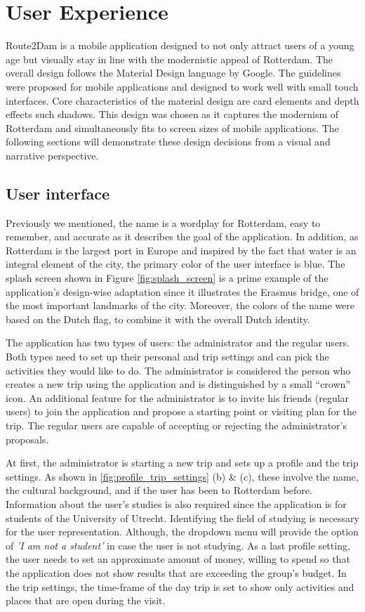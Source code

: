 \documentclass[11pt,a4paper,oneside]{article}
\begin{document}
\section{User Experience}
\label{sec:UX}
Route2Dam is a mobile application designed to not only attract users of a young age but visually stay in line with the modernistic appeal of Rotterdam. The overall design follows the Material Design language by Google.\cite{googleinc._MaterialDesign_2014} The guidelines were proposed for mobile applications and designed to work well with small touch interfaces. Core characteristics of the material design are card elements and depth effects such shadows. This design was chosen as it captures the modernism of Rotterdam and simultaneously fits to screen sizes of mobile applications. The following sections will demonstrate these design decisions from a visual and narrative perspective.

\subsection{User interface}
Previously we mentioned, the name is a wordplay for Rotterdam, easy to remember, and accurate as it describes the goal of the application. In addition, as Rotterdam is the largest port in Europe and inspired by the fact that water is an integral element of the city, the primary color of the user interface is blue. The splash screen shown in Figure \autoref{fig:splash_screen} is a prime example of the application's design-wise adaptation since it illustrates the Erasmus bridge, one of the most important landmarks of the city. Moreover, the colors of the name were based on the Dutch flag, to combine it with the overall Dutch identity.      


The application has two types of users: the administrator and the regular users. Both types need to set up their personal and trip settings and can pick the activities they would like to do. The administrator is considered the person who creates a new trip using the application and is distinguished by a small “crown” icon. An additional feature for the administrator is to invite his friends (regular users) to join the application and propose a starting point or visiting plan for the trip. The regular users are capable of accepting or rejecting the administrator’s proposals.

At first, the administrator is starting a new trip and sets up a profile and the trip settings. As shown in \autoref{fig:profile_trip_settings} (b) \& (c), these involve the name, the cultural background, and if the user has been to Rotterdam before. Information about the user's studies is also required since the application is for students of the University of Utrecht. Identifying the field of studying is necessary for the user representation. Although, the dropdown menu will provide the option of \emph{'I am not a student'} in case the user is not studying. As a last profile setting, the user needs to set an approximate amount of money, willing to spend so that the application does not show results that are exceeding the group's budget. In the trip settings, the time-frame of the day trip is set to show only activities and places that are open during the visit.
\end{document}
